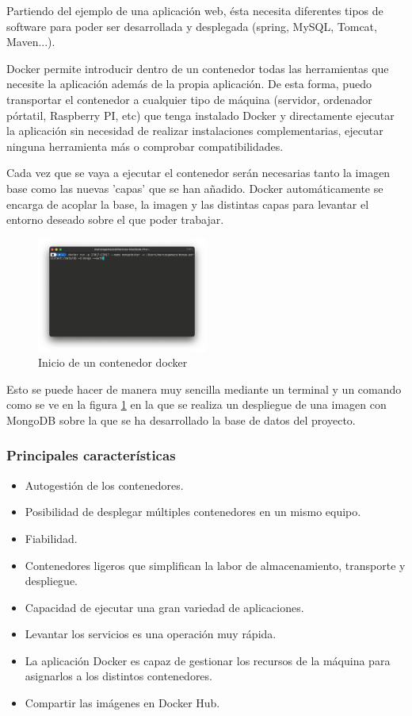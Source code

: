 Partiendo del ejemplo de una aplicación web, ésta necesita diferentes tipos de software para poder ser desarrollada y desplegada (spring, MySQL, Tomcat, Maven...). 

Docker permite introducir dentro de un contenedor todas las herramientas que necesite la aplicación además de la propia aplicación. De esta forma, puedo transportar el contenedor a cualquier tipo de máquina (servidor, ordenador pórtatil, Raspberry PI, etc) que tenga instalado Docker y directamente ejecutar la aplicación sin necesidad de realizar instalaciones complementarias, ejecutar ninguna herramienta más o comprobar compatibilidades.

Cada vez que se vaya a ejecutar el contenedor serán necesarias tanto la imagen base como las nuevas 'capas' que se han añadido. Docker automáticamente se encarga de acoplar la base, la imagen y las distintas capas para levantar el entorno deseado sobre el que poder trabajar. 

\begin{figure}[H]
    \centering
    \includegraphics[width=0.5\textwidth]{include/capturas/dockerRun.png}
    \caption{Inicio de un contenedor docker}
    \label{fig:docker_run}
\end{figure}

Esto se puede hacer de manera muy sencilla mediante un terminal \cite{basicDocker} y un comando como se ve en la figura \ref{fig:docker_run} en la que se realiza un despliegue de una imagen con MongoDB sobre la que se ha desarrollado la base de datos del proyecto.

\subsubsection{Principales características}
\begin{itemize}
    \item Autogestión de los contenedores.
    \item Posibilidad de desplegar múltiples contenedores en un mismo equipo.
    \item Fiabilidad.
    \item Contenedores ligeros que simplifican la labor de almacenamiento, transporte y despliegue.
    \item Capacidad de ejecutar una gran variedad de aplicaciones.
    \item Levantar los servicios es una operación muy rápida.
    \item La aplicación Docker es capaz de gestionar los recursos de la máquina para asignarlos a los distintos contenedores.
    \item Compartir las imágenes en Docker Hub.
\end{itemize}


